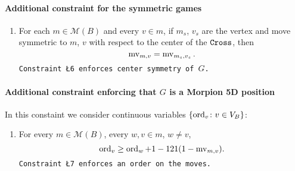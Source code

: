 \paragraph*{Additional constraint for the symmetric games} 
\begin{enumerate}[label=\L{\arabic*}.]\addtocounter{enumi}{5}
\item For each $m \in \mathcal{M}(B)$ and every $v \in m$, if $m_s$, $v_s$ are the vertex and move symmetric to $m$, $v$ with respect to the center of the $\texttt{Cross}$, then
\[
	\operatorname{mv}_{m,v} = \operatorname{mv}_{m_s, v_s}.
\]
\noindent\texttt{\small Constraint \L{6} enforces center symmetry of $G$. }
\end{enumerate}

\paragraph*{Additional constraint enforcing that $G$ is a Morpion 5D position} 
In this constaint we consider  continuous variables $\{ \operatorname{ord}_v \colon v \in V_B \}$:
\begin{enumerate}[label=\L{\arabic*}.]\addtocounter{enumi}{6}
\item For every $m \in \mathcal{M}(B)$, every $w, v \in m$, $w \neq v$,
\[
	\operatorname{ord}_v \geq \operatorname{ord}_w + 1 - 121 (1 - \operatorname{mv}_{m, v}).
\]
\noindent\texttt{\small Constraint \L{7} enforces an order on the moves. }
\end{enumerate}


